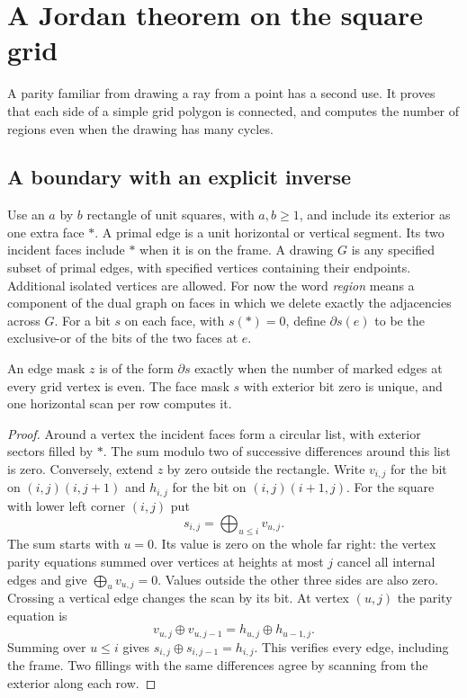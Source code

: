 \section{A Jordan theorem on the square grid}\label{sec:grid}
A parity familiar from drawing a ray from a point has a second use. It proves that each side of a simple grid polygon is connected, and computes the number of regions even when the drawing has many cycles.

\subsection{A boundary with an explicit inverse}
Use an $a$ by $b$ rectangle of unit squares, with $a,b\ge1$, and include its exterior as one extra face $*$. A primal edge is a unit horizontal or vertical segment. Its two incident faces include $*$ when it is on the frame. A drawing $G$ is any specified subset of primal edges, with specified vertices containing their endpoints. Additional isolated vertices are allowed. For now the word \emph{region} means a component of the dual graph on faces in which we delete exactly the adjacencies across $G$. For a bit $s$ on each face, with $s(*)=0$, define $\partial s(e)$ to be the exclusive-or of the bits of the two faces at $e$.

\begin{lemma}\label{lem:gridfill}\label{idx-plane7}
An edge mask $z$ is of the form $\partial s$ exactly when the number of marked edges at every grid vertex is even. The face mask $s$ with exterior bit zero is unique, and one horizontal scan per row computes it.
\end{lemma}
\begin{proof}
Around a vertex the incident faces form a circular list, with exterior sectors filled by $*$. The sum modulo two of successive differences around this list is zero. Conversely, extend $z$ by zero outside the rectangle. Write $v_{i,j}$ for the bit on $(i,j)(i,j+1)$ and $h_{i,j}$ for the bit on $(i,j)(i+1,j)$. For the square with lower left corner $(i,j)$ put
\[
 s_{i,j}=\bigoplus_{u\le i} v_{u,j}.
\]
The sum starts with $u=0$. Its value is zero on the whole far right: the vertex parity equations summed over vertices at heights at most $j$ cancel all internal edges and give $\bigoplus_u v_{u,j}=0$. Values outside the other three sides are also zero. Crossing a vertical edge changes the scan by its bit. At vertex $(u,j)$ the parity equation is
\[
 v_{u,j}\oplus v_{u,j-1}=h_{u,j}\oplus h_{u-1,j}.
\]
Summing over $u\le i$ gives $s_{i,j}\oplus s_{i,j-1}=h_{i,j}$. This verifies every edge, including the frame. Two fillings with the same differences agree by scanning from the exterior along each row.
\end{proof}

